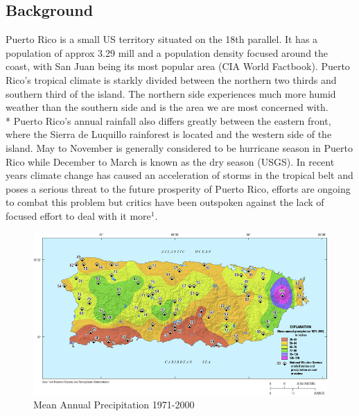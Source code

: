 \documentclass[a4paper,12pt]{article}
\begin{document}
\subsection{Background}
Puerto Rico is a small US territory situated on the 18th parallel. It has a population of approx 3.29 mill and a population density focused around the coast,
with San Juan being its most popular area (CIA World Factbook). Puerto Rico's tropical climate is starkly divided between the northern two thirds and southern third of the island.
The northern side experiences much more humid weather than the southern side and is the area we are most concerned with.\\* Puerto Rico's annual rainfall also differs greatly between the eastern front, where the Sierra de Luquillo rainforest is located and the western side of the island.
May to November is generally considered to be hurricane season in Puerto Rico while December to March is known as the dry season (USGS).
In recent years climate change has caused an acceleration of storms in the tropical belt and poses a serious threat to the future prosperity of Puerto Rico, efforts are ongoing to combat this problem but critics have been outspoken against the lack
of focused effort to deal with it more$^{1}$.
\begin{figure}[h]
\centering
\includegraphics[scale =0.5]{Rainfall}
\caption{Mean Annual Precipitation 1971-2000}
\label{rainfall}
\end{figure}
\end{document}
